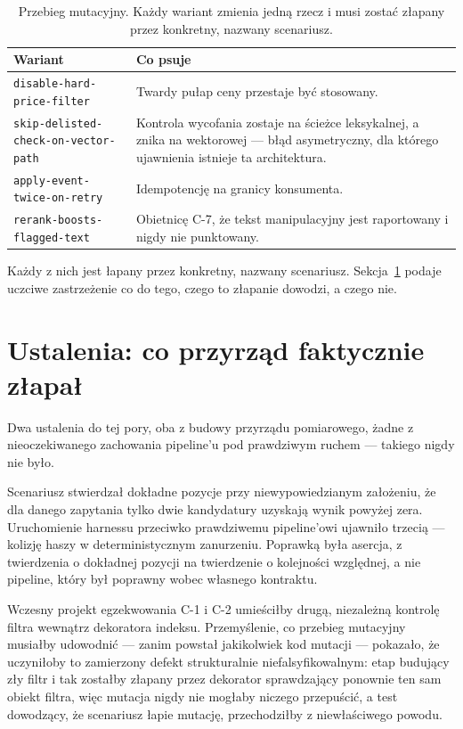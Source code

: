 \documentclass[11pt,a4paper]{article}
\newcommand{\finding}[1]{{\color{primaryblue}\textbf{#1}}}
\begin{document}
\begin{table}[htbp]
\centering
\caption{Przebieg mutacyjny. Każdy wariant zmienia jedną rzecz i musi zostać
złapany przez konkretny, nazwany scenariusz.}
\begin{tabularx}{\linewidth}{@{}lX@{}}
\toprule
\textbf{Wariant} & \textbf{Co psuje} \\
\midrule
\texttt{disable-hard-price-filter} & Twardy pułap ceny przestaje być stosowany. \\
\texttt{skip-delisted-check-on-vector-path} & Kontrola wycofania zostaje na ścieżce leksykalnej, a znika na wektorowej --- błąd asymetryczny, dla którego ujawnienia istnieje ta architektura. \\
\texttt{apply-event-twice-on-retry} & Idempotencję na granicy konsumenta. \\
\texttt{rerank-boosts-flagged-text} & Obietnicę C-7, że tekst manipulacyjny jest raportowany i nigdy nie punktowany. \\
\bottomrule
\end{tabularx}
\end{table}

Każdy z nich jest łapany przez konkretny, nazwany scenariusz.
Sekcja~\ref{sec:findings} podaje uczciwe zastrzeżenie co do tego, czego to
złapanie dowodzi, a czego nie.

\section{Ustalenia: co przyrząd faktycznie złapał}
\label{sec:findings}

Dwa ustalenia do tej pory, oba z budowy przyrządu pomiarowego, żadne z
nieoczekiwanego zachowania pipeline'u pod prawdziwym ruchem --- takiego nigdy
nie było.

\vspace{0.2cm}
\noindent\finding{F-1.} Scenariusz stwierdzał dokładne pozycje przy
niewypowiedzianym założeniu, że dla danego zapytania tylko dwie kandydatury
uzyskają wynik powyżej zera. Uruchomienie harnessu przeciwko prawdziwemu
pipeline'owi ujawniło trzecią --- kolizję haszy w deterministycznym
zanurzeniu. Poprawką była asercja, z twierdzenia o dokładnej pozycji na
twierdzenie o kolejności względnej, a nie pipeline, który był poprawny wobec
własnego kontraktu.

\vspace{0.2cm}
\noindent\finding{F-2.} Wczesny projekt egzekwowania C-1 i C-2 umieściłby
drugą, niezależną kontrolę filtra wewnątrz dekoratora indeksu. Przemyślenie,
co przebieg mutacyjny musiałby udowodnić --- zanim powstał jakikolwiek kod
mutacji --- pokazało, że uczyniłoby to zamierzony defekt strukturalnie
niefalsyfikowalnym: etap budujący zły filtr i tak zostałby złapany przez
dekorator sprawdzający ponownie ten sam obiekt filtra, więc mutacja nigdy nie
mogłaby niczego przepuścić, a test dowodzący, że scenariusz łapie mutację,
przechodziłby z niewłaściwego powodu.
\end{document}
